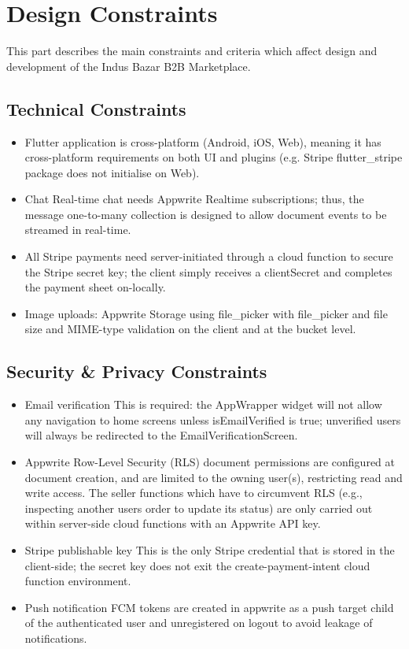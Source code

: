 \section{Design Constraints}
This part describes the main constraints and criteria which affect design and development of the Indus Bazar B2B Marketplace.

\subsection{Technical Constraints}
\begin{itemize}
    \item Flutter application is cross-platform (Android, iOS, Web), meaning it has cross-platform requirements on both UI and plugins (e.g. Stripe flutter\_stripe package does not initialise on Web).
    \item Chat Real-time chat needs Appwrite Realtime subscriptions; thus, the message one-to-many collection is designed to allow document events to be streamed in real-time.
    \item All Stripe payments need server-initiated through a cloud function to secure the Stripe secret key; the client simply receives a clientSecret and completes the payment sheet on-locally.
    \item Image uploads: Appwrite Storage using file\_picker with file\_picker and file size and MIME-type validation on the client and at the bucket level.
\end{itemize}

\subsection{Security \& Privacy Constraints}
\begin{itemize}
    \item Email verification This is required: the AppWrapper widget will not allow any navigation to home screens unless isEmailVerified is true; unverified users will always be redirected to the EmailVerificationScreen.
    \item Appwrite Row-Level Security (RLS) document permissions are configured at document creation, and are limited to the owning user(s), restricting read and write access. The seller functions which have to circumvent RLS (e.g., inspecting another users order to update its status) are only carried out within server-side cloud functions with an Appwrite API key.
    \item Stripe publishable key This is the only Stripe credential that is stored in the client-side; the secret key does not exit the create-payment-intent cloud function environment.
    \item Push notification FCM tokens are created in appwrite as a push target child of the authenticated user and unregistered on logout to avoid leakage of notifications.
\end{itemize}

